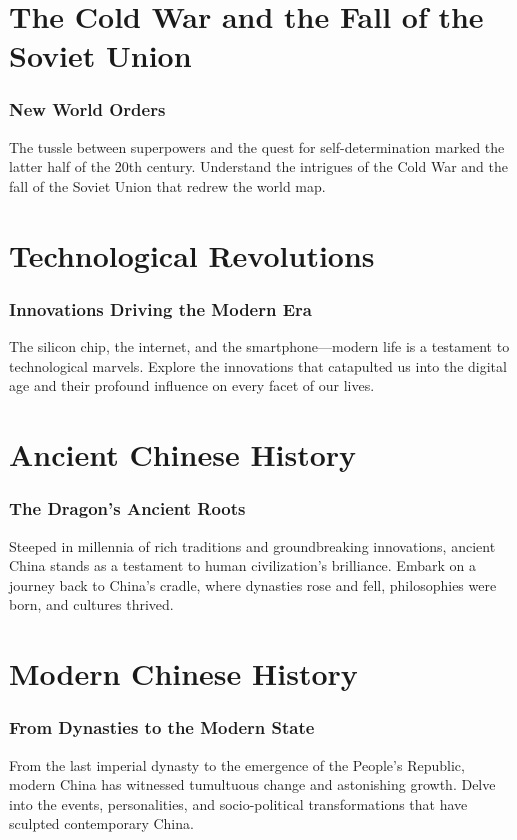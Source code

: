 \documentclass[a4paper,12pt]{book}
\begin{document}
\chapter{The Cold War and the Fall of the Soviet Union}
\subsection*{New World Orders}
The tussle between superpowers and the quest for self-determination marked the latter half of the 20th century. Understand the intrigues of the Cold War and the fall of the Soviet Union that redrew the world map.

\chapter{Technological Revolutions}
\subsection*{Innovations Driving the Modern Era}
The silicon chip, the internet, and the smartphone—modern life is a testament to technological marvels. Explore the innovations that catapulted us into the digital age and their profound influence on every facet of our lives.

\chapter{Ancient Chinese History}
\subsection*{The Dragon's Ancient Roots}
Steeped in millennia of rich traditions and groundbreaking innovations, ancient China stands as a testament to human civilization's brilliance. Embark on a journey back to China's cradle, where dynasties rose and fell, philosophies were born, and cultures thrived.

\chapter{Modern Chinese History}
\subsection*{From Dynasties to the Modern State}
From the last imperial dynasty to the emergence of the People's Republic, modern China has witnessed tumultuous change and astonishing growth. Delve into the events, personalities, and socio-political transformations that have sculpted contemporary China.
\end{document}
